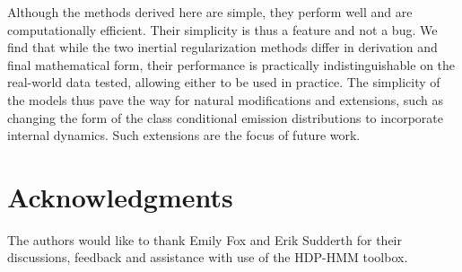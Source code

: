 \documentclass[12pt]{article}
\begin{document}
Although the methods derived here are simple, they perform well and are computationally efficient. Their simplicity is thus a feature and not a bug. We find that while the two inertial regularization methods differ in derivation and final mathematical form, their performance is practically indistinguishable on the real-world data tested, allowing either to be used in practice.  The simplicity of the models thus pave the way for natural modifications and extensions, such as changing the form of the class conditional emission distributions to incorporate internal dynamics. Such extensions are the focus of future work.

\section{Acknowledgments}

The authors would like to thank Emily Fox and Erik Sudderth for their discussions, feedback and assistance with use of the HDP-HMM toolbox.



\end{document}
